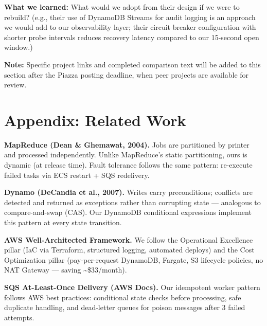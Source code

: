 \documentclass[11pt,letterpaper]{article}
\begin{document}
\textbf{What we learned:} What would we adopt from their design if we were to rebuild? (e.g., their use of DynamoDB Streams for audit logging is an approach we would add to our observability layer; their circuit breaker configuration with shorter probe intervals reduces recovery latency compared to our 15-second open window.)

\medskip
\begin{tcolorbox}[
  colback=surface,
  colframe=border,
  boxrule=0.6pt,
  arc=2pt,
  left=8pt, right=8pt, top=6pt, bottom=6pt,
]
  \textbf{Note:} Specific project links and completed comparison text will be added to this section after the Piazza posting deadline, when peer projects are available for review.
\end{tcolorbox}


\section*{Appendix: Related Work}

\textbf{MapReduce (Dean \& Ghemawat, 2004).} Jobs are partitioned by printer and processed independently. Unlike MapReduce's static partitioning, ours is dynamic (at release time). Fault tolerance follows the same pattern: re-execute failed tasks via ECS restart + SQS redelivery.

\textbf{Dynamo (DeCandia et al., 2007).} Writes carry preconditions; conflicts are detected and returned as exceptions rather than corrupting state --- analogous to compare-and-swap (CAS). Our DynamoDB conditional expressions implement this pattern at every state transition.

\textbf{AWS Well-Architected Framework.} We follow the Operational Excellence pillar (IaC via Terraform, structured logging, automated deploys) and the Cost Optimization pillar (pay-per-request DynamoDB, Fargate, S3 lifecycle policies, no NAT Gateway --- saving \textasciitilde\$33/month).

\textbf{SQS At-Least-Once Delivery (AWS Docs).} Our idempotent worker pattern follows AWS best practices: conditional state checks before processing, safe duplicate handling, and dead-letter queues for poison messages after 3 failed attempts.
\end{document}
